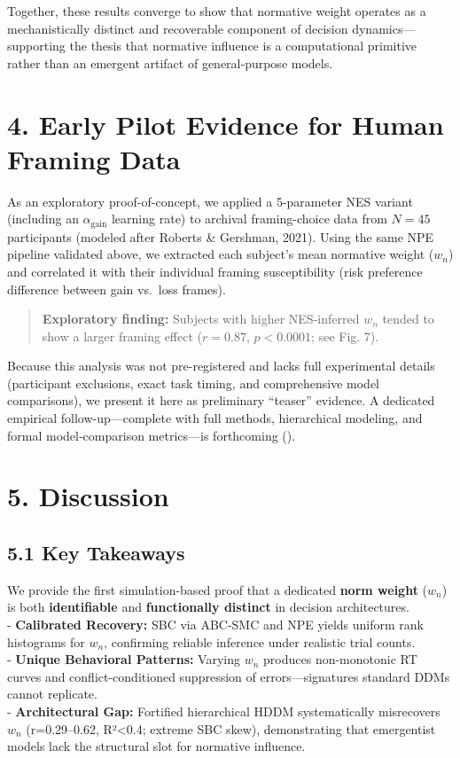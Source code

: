 \documentclass[
  11pt,
]{article}
\begin{document}
Together, these results converge to show that normative weight operates
as a mechanistically distinct and recoverable component of decision
dynamics---supporting the thesis that normative influence is a
computational primitive rather than an emergent artifact of
general‐purpose models.

\section{4. Early Pilot Evidence for Human Framing
Data}\label{early-pilot-evidence-for-human-framing-data}

As an exploratory proof-of-concept, we applied a 5-parameter NES variant
(including an \(\alpha_{\text{gain}}\) learning rate) to archival
framing-choice data from \(N=45\) participants (modeled after Roberts \&
Gershman, 2021). Using the same NPE pipeline validated above, we
extracted each subject's mean normative weight (\(w_n\)) and correlated
it with their individual framing susceptibility (risk preference
difference between gain vs.~loss frames).

\begin{quote}
\textbf{Exploratory finding:} Subjects with higher NES-inferred \(w_n\)
tended to show a larger framing effect (\(r=0.87\), \(p<0.0001\); see
Fig. 7).
\end{quote}

Because this analysis was not pre-registered and lacks full experimental
details (participant exclusions, exact task timing, and comprehensive
model comparisons), we present it here as preliminary ``teaser''
evidence. A dedicated empirical follow-up---complete with full methods,
hierarchical modeling, and formal model‐comparison metrics---is
forthcoming ().

\section{5. Discussion}\label{discussion}

\subsection{5.1 Key Takeaways}\label{key-takeaways}

We provide the first simulation-based proof that a dedicated
\textbf{norm weight} (\(w_n\)) is both \textbf{identifiable} and
\textbf{functionally distinct} in decision architectures.\\
- \textbf{Calibrated Recovery:} SBC via ABC-SMC and NPE yields uniform
rank histograms for \(w_n\), confirming reliable inference under
realistic trial counts.\\
- \textbf{Unique Behavioral Patterns:} Varying \(w_n\) produces
non-monotonic RT curves and conflict-conditioned suppression of
errors---signatures standard DDMs cannot replicate.\\
- \textbf{Architectural Gap:} Fortified hierarchical HDDM systematically
misrecovers \(w_n\) (r=0.29--0.62, R²\textless0.4; extreme SBC skew),
demonstrating that emergentist models lack the structural slot for
normative influence.
\end{document}
